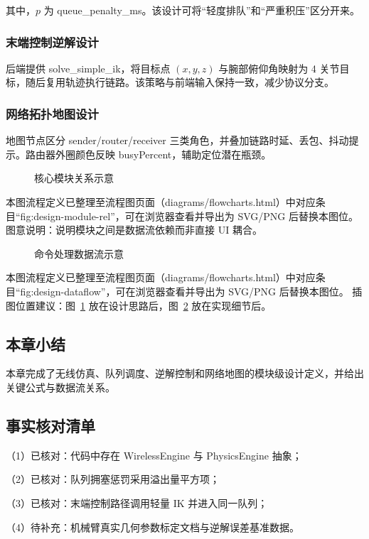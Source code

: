 其中，$p$ 为 queue\_penalty\_ms。该设计可将“轻度排队”和“严重积压”区分开来。

\subsubsection{末端控制逆解设计}
后端提供 solve\_simple\_ik，将目标点 $(x,y,z)$ 与腕部俯仰角映射为 4 关节目标，随后复用轨迹执行链路。该策略与前端输入保持一致，减少协议分支。

\subsubsection{网络拓扑地图设计}
地图节点区分 sender/router/receiver 三类角色，并叠加链路时延、丢包、抖动提示。路由器外圈颜色反映 busyPercent，辅助定位潜在瓶颈。

\begin{figure}[htbp]
\centering
{}
\caption{核心模块关系示意}
\label{fig:design-module-rel}
\end{figure}

\noindent 本图流程定义已整理至流程图页面（diagrams/flowcharts.html）中对应条目“fig:design-module-rel”，可在浏览器查看并导出为 SVG/PNG 后替换本图位。
\noindent 图意说明：说明模块之间是数据流依赖而非直接 UI 耦合。

\begin{figure}[htbp]
\centering
{}
\caption{命令处理数据流示意}
\label{fig:design-dataflow}
\end{figure}

\noindent 本图流程定义已整理至流程图页面（diagrams/flowcharts.html）中对应条目“fig:design-dataflow”，可在浏览器查看并导出为 SVG/PNG 后替换本图位。
\noindent 插图位置建议：图~\ref{fig:design-module-rel} 放在设计思路后，图~\ref{fig:design-dataflow} 放在实现细节后。

\subsection{本章小结}
本章完成了无线仿真、队列调度、逆解控制和网络地图的模块级设计定义，并给出关键公式与数据流关系。

\subsection{事实核对清单}
（1）已核对：代码中存在 WirelessEngine 与 PhysicsEngine 抽象；

（2）已核对：队列拥塞惩罚采用溢出量平方项；

（3）已核对：末端控制路径调用轻量 IK 并进入同一队列；

（4）待补充：机械臂真实几何参数标定文档与逆解误差基准数据。
